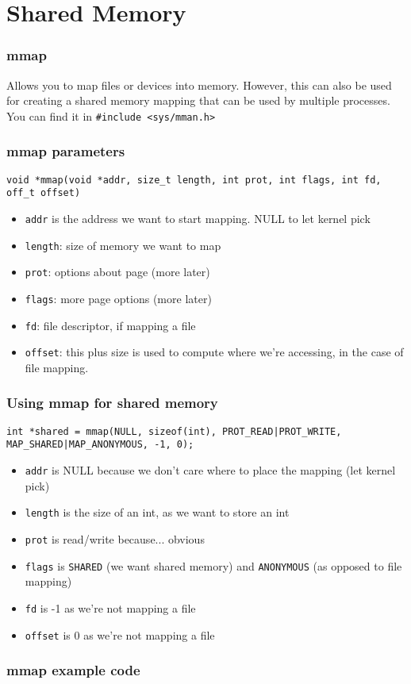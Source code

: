 \documentclass{beamer}
\begin{document}
\section{Shared Memory}
\begin{frame}
  \frametitle{mmap}
  Allows you to map files or devices into memory. However, this can also be used for creating a shared memory mapping that can be used by multiple processes.\newline
  \newline
  You can find it in \texttt{\#include <sys/mman.h>}
\end{frame}
\begin{frame}[fragile]
  \frametitle{mmap parameters}
  \begin{lstlisting}[style=customcbig]
    void *mmap(void *addr, size_t length, int prot, int flags, int fd, off_t offset)
  \end{lstlisting}
  \begin{itemize}
    \item \texttt{addr} is the address we want to start mapping. NULL to let kernel pick
    \item \texttt{length}: size of memory we want to map
    \item \texttt{prot}: options about page (more later)
    \item \texttt{flags}: more page options (more later)
    \item \texttt{fd}: file descriptor, if mapping a file
    \item \texttt{offset}: this plus size is used to compute where we're accessing, in the case of file mapping.
  \end{itemize}
\end{frame}
\begin{frame}[fragile]
  \frametitle{Using mmap for shared memory}
  \begin{lstlisting}[style=customcbig]
    int *shared = mmap(NULL, sizeof(int), PROT_READ|PROT_WRITE, MAP_SHARED|MAP_ANONYMOUS, -1, 0); 
  \end{lstlisting}
  \begin{itemize}
    \item \texttt{addr} is NULL because we don't care where to place the mapping (let kernel pick)
    \item \texttt{length} is the size of an int, as we want to store an int
    \item \texttt{prot} is read/write because... obvious
    \item \texttt{flags} is \texttt{SHARED} (we want shared memory) and \texttt{ANONYMOUS} (as opposed to file mapping)
    \item \texttt{fd} is -1 as we're not mapping a file
    \item \texttt{offset} is 0 as we're not mapping a file
  \end{itemize}
\end{frame}
\begin{frame}
  \frametitle{mmap example code}
  
\end{frame}
\end{document}
